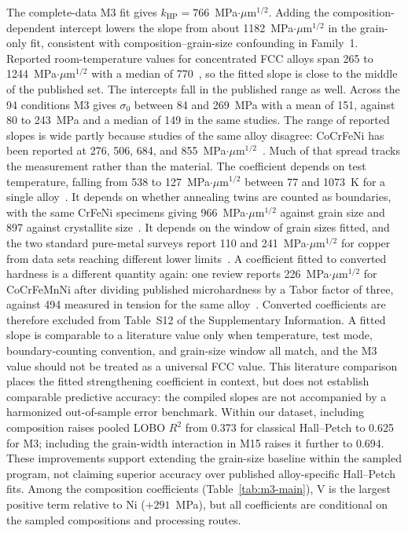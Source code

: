\documentclass[5p,times,twocolumn]{elsarticle}
\begin{document}
The complete-data M3 fit gives $k_{\mathrm{HP}}=766$~MPa$\cdot\mu$m$^{1/2}$. Adding the composition-dependent intercept lowers the slope from about 1182~MPa$\cdot\mu$m$^{1/2}$ in the grain-only fit, consistent with composition--grain-size confounding in Family~1. Reported room-temperature values for concentrated FCC alloys span 265 to 1244~MPa$\cdot\mu$m$^{1/2}$ with a median of 770~\cite{Yoshida2017,Otto2013,Yoshida2019acta,SchneiderCrFeNi2021,LiKHP2024,Jagetia2021}, so the fitted slope is close to the middle of the published set. The intercepts fall in the published range as well. Across the 94 conditions M3 gives $\sigma_0$ between 84 and 269~MPa with a mean of 151, against 80 to 243~MPa and a median of 149 in the same studies. The range of reported slopes is wide partly because studies of the same alloy disagree: CoCrFeNi has been reported at 276, 506, 684, and 855~MPa$\cdot\mu$m$^{1/2}$~\cite{Yoshida2019acta,LiKHP2024,Jagetia2021,WuGaoBei2016}. Much of that spread tracks the measurement rather than the material. The coefficient depends on test temperature, falling from 538 to 127~MPa$\cdot\mu$m$^{1/2}$ between 77 and 1073~K for a single alloy~\cite{Otto2013}. It depends on whether annealing twins are counted as boundaries, with the same CrFeNi specimens giving 966~MPa$\cdot\mu$m$^{1/2}$ against grain size and 897 against crystallite size~\cite{SchneiderCrFeNi2021}. It depends on the window of grain sizes fitted, and the two standard pure-metal surveys report 110 and 241~MPa$\cdot\mu$m$^{1/2}$ for copper from data sets reaching different lower limits~\cite{Cordero2016,Figueiredo2023}. A coefficient fitted to converted hardness is a different quantity again: one review reports 226~MPa$\cdot\mu$m$^{1/2}$ for CoCrFeMnNi after dividing published microhardness by a Tabor factor of three, against 494 measured in tension for the same alloy~\cite{LiRitchieMeyers2019,Otto2013}. Converted coefficients are therefore excluded from Table~S12 of the Supplementary Information. A fitted slope is comparable to a literature value only when temperature, test mode, boundary-counting convention, and grain-size window all match, and the M3 value should not be treated as a universal FCC value. This literature comparison places the fitted strengthening coefficient in context, but does not establish comparable predictive accuracy: the compiled slopes are not accompanied by a harmonized out-of-sample error benchmark. Within our dataset, including composition raises pooled LOBO $R^2$ from 0.373 for classical Hall--Petch to 0.625 for M3; including the grain-width interaction in M15 raises it further to 0.694. These improvements support extending the grain-size baseline within the sampled program, not claiming superior accuracy over published alloy-specific Hall--Petch fits. Among the composition coefficients (Table~\ref{tab:m3-main}), V is the largest positive term relative to Ni ($+291$~MPa), but all coefficients are conditional on the sampled compositions and processing routes.
\end{document}
